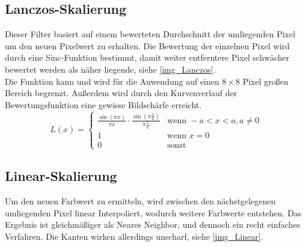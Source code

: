 \subsection{Lanczos-Skalierung}
Dieser Filter basiert auf einem bewerteten Durchschnitt der umliegenden Pixel um den neuen Pixelwert zu erhalten. Die Bewertung der einzelnen Pixel wird durch eine Sinc-Funktion bestimmt, damit weiter entferntere Pixel schwächer bewertet werden als näher liegende, siehe \autoref{img_Lanczos}.\\
Die Funktion kann und wird für die Anwendung auf einen $8\times 8$ Pixel großen Bereich begrenzt. Außerdem wird durch den Kurvenverlauf der Bewertungsfunktion eine gewisse Bildschärfe erreicht.\\
\cite{wiki_Lanczos}
\[ L(x)= \left\{ \begin{array}{ll}
\frac{\sin(\pi x)}{\pi x} \cdot \frac{\sin(\pi \frac{x}{a})}{\pi \frac{x}{a}} & \textrm{wenn } -a < x <a, a\ne 0\\
1 & \textrm{wenn } x = 0\\
0 & \textrm{sonst}
\end{array}\right. \]
\subsection{Linear-Skalierung}
Um den neuen Farbwert zu ermitteln, wird zwischen den nächstgelegenen umliegenden Pixel linear Interpoliert, wodurch weitere Farbwerte entstehen. Das Ergebnis ist gleichmäßiger als Neares Neighbor, und dennoch ein recht einfaches Verfahren. Die Kanten wirken allerdings unscharf, siehe \autoref{img_Linear}.
